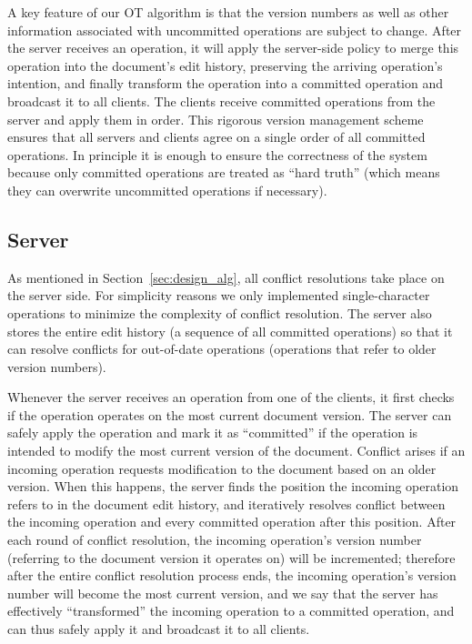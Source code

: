 A key feature of our OT algorithm is that the version numbers as well as other
information associated with uncommitted operations are subject to change. After
the server receives an operation, it will apply the server-side policy to merge
this operation into the document's edit history, preserving the arriving
operation's intention, and finally transform the operation into a committed
operation and broadcast it to all clients. The clients receive committed
operations from the server and apply them in order. This rigorous version
management scheme ensures that all servers and clients agree on a single order
of all committed operations. In principle it is enough to ensure the correctness
of the system because only committed operations are treated as ``hard truth''
(which means they can overwrite uncommitted operations if necessary).

\subsection{Server}
\label{sec:design_server}

As mentioned in Section~\ref{sec:design_alg}, all conflict resolutions take place
on the server side. For simplicity reasons we only implemented single-character
operations to minimize the complexity of conflict resolution. The server also
stores the entire edit history (a sequence of all committed operations) so that
it can resolve conflicts for out-of-date operations (operations that refer to
older version numbers).

Whenever the server receives an operation from one of the clients, it first
checks if the operation operates on the most current document version. The
server can safely apply the operation and mark it as ``committed'' if the
operation is intended to modify the most current version of the document.
Conflict arises if an incoming operation requests modification to the document
based on an older version. When this happens, the server finds the position the
incoming operation refers to in the document edit history, and iteratively
resolves conflict between the incoming operation and every committed operation
after this position. After each round of conflict resolution, the incoming
operation's version number (referring to the document version it operates on)
will be incremented; therefore after the entire conflict resolution process
ends, the incoming operation's version number will become the most current
version, and we say that the server has effectively ``transformed'' the incoming
operation to a committed operation, and can thus safely apply it and broadcast
it to all clients.

